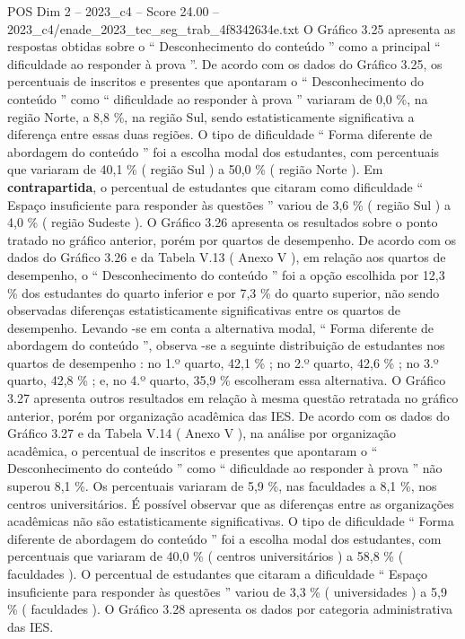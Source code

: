 \begin{textsample}{POS Dim 2 – 2023\_c4 – Score 24.00 – 2023\_c4/enade\_2023\_tec\_seg\_trab\_4f8342634e.txt}
O Gráfico 3.25 apresenta as respostas obtidas sobre o “ Desconhecimento do conteúdo ” como a principal “ dificuldade ao responder à prova ”.
De acordo com os dados do Gráfico 3.25, os percentuais de inscritos e presentes que apontaram o “ Desconhecimento do conteúdo ” como “ dificuldade ao responder à prova ” variaram de 0,0 \%, na região Norte, a 8,8 \%, na região Sul, sendo estatisticamente significativa a diferença entre essas duas regiões.
O tipo de dificuldade “ Forma diferente de abordagem do conteúdo ” foi a escolha modal dos estudantes, com percentuais que variaram de 40,1 \% ( região Sul ) a 50,0 \% ( região Norte ).
Em \textbf{contrapartida}, o percentual de estudantes que citaram como dificuldade “ Espaço insuficiente para responder às questões ” variou de 3,6 \% ( região Sul ) a 4,0 \% ( região Sudeste ).
O Gráfico 3.26 apresenta os resultados sobre o ponto tratado no gráfico anterior, porém por quartos de desempenho.
De acordo com os dados do Gráfico 3.26 e da Tabela V.13 ( Anexo V ), em relação aos quartos de desempenho, o “ Desconhecimento do conteúdo ” foi a opção escolhida por 12,3 \% dos estudantes do quarto inferior e por 7,3 \% do quarto superior, não sendo observadas diferenças estatisticamente significativas entre os quartos de desempenho.
Levando -se em conta a alternativa modal, “ Forma diferente de abordagem do conteúdo ”, observa -se a seguinte distribuição de estudantes nos quartos de desempenho : no 1.º quarto, 42,1 \% ; no 2.º quarto, 42,6 \% ; no 3.º quarto, 42,8 \% ; e, no 4.º quarto, 35,9 \% escolheram essa alternativa.
O Gráfico 3.27 apresenta outros resultados em relação à mesma questão retratada no gráfico anterior, porém por organização acadêmica das IES.
De acordo com os dados do Gráfico 3.27 e da Tabela V.14 ( Anexo V ), na análise por organização acadêmica, o percentual de inscritos e presentes que apontaram o “ Desconhecimento do conteúdo ” como “ dificuldade ao responder à prova ” não superou 8,1 \%.
Os percentuais variaram de 5,9 \%, nas faculdades a 8,1 \%, nos centros universitários.
É possível observar que as diferenças entre as organizações acadêmicas não são estatisticamente significativas.
O tipo de dificuldade “ Forma diferente de abordagem do conteúdo ” foi a escolha modal dos estudantes, com percentuais que variaram de 40,0 \% ( centros universitários ) a 58,8 \% ( faculdades ).
O percentual de estudantes que citaram a dificuldade “ Espaço insuficiente para responder às questões ” variou de 3,3 \% ( universidades ) a 5,9 \% ( faculdades ).
O Gráfico 3.28 apresenta os dados por categoria administrativa das IES.

\end{textsample}
